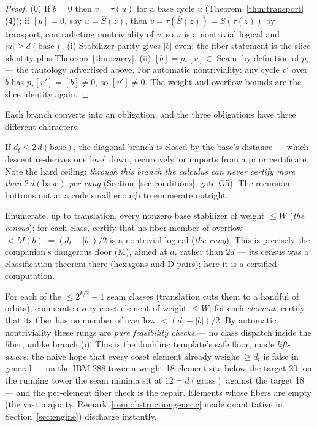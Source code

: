 \documentclass[11pt]{article}
\theoremstyle{plain}
\theoremstyle{definition}
\theoremstyle{remark}
\newcommand{\Seam}{\operatorname{Seam}}
\newcommand{\base}{\mathrm{base}}
\newcommand{\wt}[1]{\lvert #1\rvert}
\newcommand{\ov}[1]{\overline{#1}}
\begin{document}
\begin{proof}
(0) If $b = 0$ then $v = \tau(u)$ for a base cycle $u$
(Theorem~\ref{thm:transport}(4)); if $[u] = 0$, say $u = \ov S(z)$, then
$v = \tau(\ov S(z)) = S(\tau(z))$ by transport, contradicting
nontriviality of $v$; so $u$ is a nontrivial logical and $\wt u \geq
d(\base)$.
(i) Stabilizer parity gives $\wt b$ even; the fiber statement is the
slice identity plus Theorem~\ref{thm:carry}.
(ii) $[b] = p_*[v] \in \Seam$ by definition of $p_*$ --- the tautology
advertised above. For automatic nontriviality: any cycle $v'$ over $b$
has $p_*[v'] = [b] \neq 0$, so $[v'] \neq 0$. The weight and overflow
bounds are the slice identity again.
\end{proof}

Each branch converts into an obligation, and the three obligations have
three different characters:

\begin{description}[leftmargin=2em,style=nextline]
\item[(0) needs one number: $d(\base)$.] If $d_t \leq 2\,d(\base)$, the
  diagonal branch is closed by the base's distance --- which descent
  re-derives one level down, recursively, or imports from a prior
  certificate. Note the hard ceiling: \emph{through this branch the
  calculus can never certify more than $2\,d(\base)$ per rung}
  (Section~\ref{sec:conditions}, gate G5). The recursion bottoms out at a
  code small enough to enumerate outright.
\item[(i) needs a census and rungs.] Enumerate, up to translation, every
  nonzero base stabilizer of weight $\leq W$ (\emph{the census});
  for each class, certify that no fiber member of overflow $< M(b) :=
  (d_t - \wt b)/2$ is a nontrivial logical (\emph{the rung}). This is
  precisely the companion's dangerous floor (M), aimed at $d_t$ rather
  than $2d$ --- its census was a classification theorem there (hexagons
  and D-pairs); here it is a certified computation.
\item[(ii) needs coset censuses and per-element rungs.] For each of the
  $\leq 2^{k/2} - 1$ seam classes (translation cuts them to a handful of
  orbits), enumerate every coset element of weight $\leq W$; for each
  \emph{element}, certify that its fiber has no member of overflow $<
  (d_t - \wt b)/2$. By automatic nontriviality these rungs are \emph{pure
  feasibility checks} --- no class dispatch inside the fiber, unlike
  branch (i). This is the doubling template's safe floor, made
  \emph{lift-aware}: the naive hope that every coset element already
  weighs $\geq d_t$ is false in general --- on the IBM-288 tower a
  weight-18 element sits below the target 20; on the running tower the
  seam minima sit at $12 = d(\mathrm{gross})$ against the target 18 ---
  and the per-element fiber check is the repair. Elements whose fibers
  are empty (the vast majority, Remark~\ref{rem:obstructiongeneric} made
  quantitative in Section~\ref{sec:engine}) discharge instantly.
\end{description}
\end{document}
